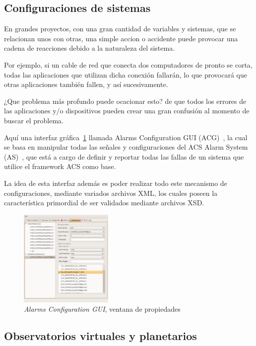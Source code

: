 \subsection{Configuraciones de sistemas}

En grandes proyectos, con una gran cantidad de variables y sistemas, que se relacionan
unos con otras, una simple accion o accidente puede provocar una cadena de reacciones
debido a la naturaleza del sistema.

Por ejemplo, si un cable de red que conecta dos computadores de pronto se corta,
todas las aplicaciones que utilizan dicha conexión fallarán, lo que provocará
que otras aplicaciones también fallen, y así sucesivamente.

¿Que problema más profundo puede ocacionar esto?
de que todos los errores de las aplicaciones y/o dispositivos pueden crear
una gran confusión al momento de buscar el problema.

Aquí una interfaz gráfica~\ref{fig:acg} llamada Alarms Configuration GUI (ACG)~\cite{acg},
la cual se basa en manipular todas las señales y configuraciones del ACS Alarm System (AS)~\cite{as},
que está a cargo de definir y reportar todas las fallas de un sistema que utilice
el framework ACS como base.

La idea de esta interfaz además es poder realizar todo este mecanismo de configuraciones,
mediante variados archivos XML, los cuales poseen la característica primordial de ser
validados mediante archivos XSD.

\begin{figure}[!htb]
    \centering
    \includegraphics[width=0.4\textwidth]{img/acg}
    \caption{\emph{Alarms Configuration GUI}, ventana de propiedades}
    \label{fig:acg}
\end{figure}

\subsection{Observatorios virtuales y planetarios}


